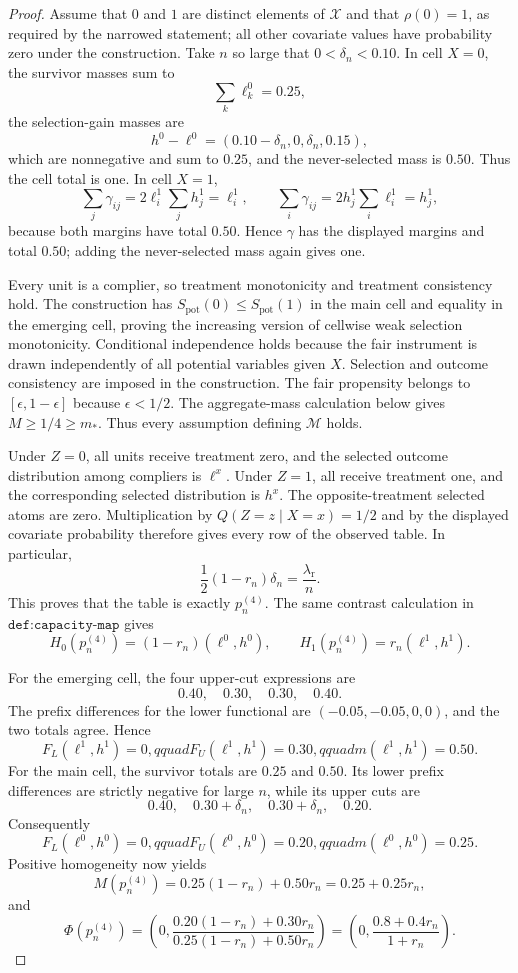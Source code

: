 \documentclass{article}
\begin{document}
\begin{proof}
Assume that \(0\) and \(1\) are distinct elements of \(\mathcal X\) and that \(\rho(0)=1\), as required by the narrowed statement; all other covariate values have probability zero under the construction.  Take \(n\) so large that \(0<\delta_n<0.10\).  In cell \(X=0\), the survivor masses sum to
\[
\sum_k\ell_k^0=0.25,
\]
the selection-gain masses are
\[
h^0-\ell^0=(0.10-\delta_n,0,\delta_n,0.15),
\]
which are nonnegative and sum to \(0.25\), and the never-selected mass is \(0.50\).  Thus the cell total is one.  In cell \(X=1\),
\[
\sum_j\gamma_{ij}=2\ell_i^1\sum_jh_j^1=\ell_i^1,
\qquad
\sum_i\gamma_{ij}=2h_j^1\sum_i\ell_i^1=h_j^1,
\]
because both margins have total \(0.50\).  Hence \(\gamma\) has the displayed margins and total \(0.50\); adding the never-selected mass again gives one.

Every unit is a complier, so treatment monotonicity and treatment consistency hold.  The construction has \(S_{\mathrm{pot}}(0)\le S_{\mathrm{pot}}(1)\) in the main cell and equality in the emerging cell, proving the increasing version of cellwise weak selection monotonicity.  Conditional independence holds because the fair instrument is drawn independently of all potential variables given \(X\).  Selection and outcome consistency are imposed in the construction.  The fair propensity belongs to \([\epsilon,1-\epsilon]\) because \(\epsilon<1/2\).  The aggregate-mass calculation below gives \(M\ge1/4\ge m_*\).  Thus every assumption defining \(\mathcal M\) holds.

Under \(Z=0\), all units receive treatment zero, and the selected outcome distribution among compliers is \(\ell^x\).  Under \(Z=1\), all receive treatment one, and the corresponding selected distribution is \(h^x\).  The opposite-treatment selected atoms are zero.  Multiplication by \(Q(Z=z\mid X=x)=1/2\) and by the displayed covariate probability therefore gives every row of the observed table.  In particular,
\[
\frac12(1-r_n)\delta_n=\frac{\lambda_{\mathrm r}}n.
\]
This proves that the table is exactly \(p_n^{(4)}\).  The same contrast calculation in \(\texttt{def:capacity-map}\) gives
\[
H_0(p_n^{(4)})=(1-r_n)(\ell^0,h^0),
\qquad
H_1(p_n^{(4)})=r_n(\ell^1,h^1).
\]

For the emerging cell, the four upper-cut expressions are
\[
0.40,\quad0.30,\quad0.30,\quad0.40.
\]
The prefix differences for the lower functional are \((-0.05,-0.05,0,0)\), and the two totals agree.  Hence
\[
F_L(\ell^1,h^1)=0,qquad F_U(\ell^1,h^1)=0.30,qquad m(\ell^1,h^1)=0.50.
\]
For the main cell, the survivor totals are \(0.25\) and \(0.50\).  Its lower prefix differences are strictly negative for large \(n\), while its upper cuts are
\[
0.40,\quad0.30+\delta_n,\quad0.30+\delta_n,\quad0.20.
\]
Consequently
\[
F_L(\ell^0,h^0)=0,qquad F_U(\ell^0,h^0)=0.20,qquad m(\ell^0,h^0)=0.25.
\]
Positive homogeneity now yields
\[
M(p_n^{(4)})=0.25(1-r_n)+0.50r_n=0.25+0.25r_n,
\]
and
\[
\Phi(p_n^{(4)})=
\left(0,\frac{0.20(1-r_n)+0.30r_n}{0.25(1-r_n)+0.50r_n}\right)
=\left(0,\frac{0.8+0.4r_n}{1+r_n}\right).
\]


\end{proof}
\end{document}
